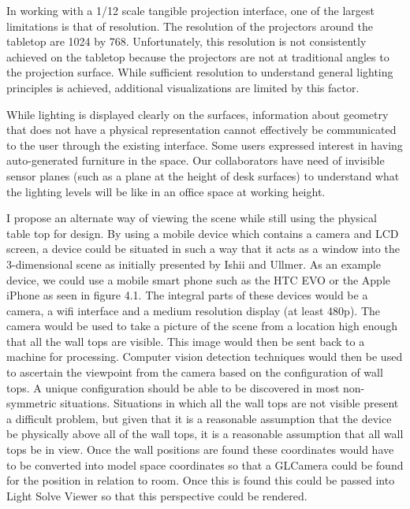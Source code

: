 In working with a 1/12 scale tangible projection interface, one of the largest limitations is that of resolution.  The resolution of the projectors around the tabletop are 1024 by 768.  Unfortunately, this resolution is not consistently achieved on the tabletop because the projectors are not at traditional angles to the projection surface.  While sufficient resolution to understand general lighting principles is achieved, additional visualizations are limited by this factor.  

While lighting is displayed clearly on the surfaces, information about geometry that does not have a physical representation cannot effectively be communicated to the user through the existing interface.  Some users expressed interest in having auto-generated furniture in the space.  Our collaborators have need of invisible sensor planes (such as a plane at the height of desk surfaces) to understand what the lighting levels will be like in an office space at working height.  

I propose an alternate way of viewing the scene while still using the physical table top for design.  By using a mobile device which contains a camera and LCD screen, a device could be situated in such a way that it acts as a window into the 3-dimensional scene as initially presented by Ishii and Ullmer\cite{Ishii97tangiblebits}.  As an example device, we could use a mobile smart phone such as the HTC EVO or the Apple iPhone as seen in figure 4.1.  The integral parts of these devices would be a camera, a wifi interface and a medium resolution display (at least 480p).  The camera would be used to take a picture of the scene from a location high enough that all the wall tops are visible.  This image would then be sent back to a machine for processing.  Computer vision detection techniques would then be used to ascertain the viewpoint from the camera based on the configuration of wall tops.  A unique configuration should be able to be discovered in most non-symmetric situations.  Situations in which all the wall tops are not visible present a difficult problem, but given that it is a reasonable assumption that the device be physically above all of the wall tops, it is a reasonable assumption that all wall tops be in view.  Once the wall positions are found these coordinates would have to be converted into model space coordinates so that a GLCamera could be found for the position in relation to room.  Once this is found this could be passed into Light Solve Viewer so that this perspective could be rendered.


